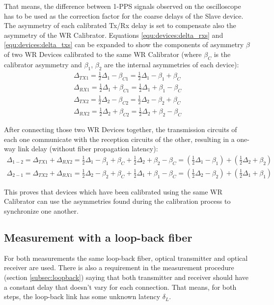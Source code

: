 That means, the difference between 1-PPS signals observed on the oscilloscope
has to be used as the correction factor for the coarse delays of the Slave
device.\\

The asymmetry of each calibrated Tx/Rx delay is set to compensate also the
asymmetry of the WR Calibrator. Equations \ref{equ:devices:delta_rxs} and
\ref{equ:devices:delta_txs} can be expanded to show the
components of asymmetry $\beta$ of two WR Devices calibrated to the same WR
Calibrator (where $\beta_C$ is the calibrator asymmetry and $\beta_1$,
$\beta_2$ are the internal asymmetries of each device):
\begin{align}
	\Delta_{TX1} = \frac{1}{2}\Delta_1 - \beta_{C1} = \frac{1}{2}\Delta_1 - \beta_1 + \beta_C \\
	\Delta_{RX1} = \frac{1}{2}\Delta_1 + \beta_{C1} = \frac{1}{2}\Delta_1 + \beta_1 - \beta_C \\
	\Delta_{TX2} = \frac{1}{2}\Delta_2 - \beta_{C2} = \frac{1}{2}\Delta_2 - \beta_2 + \beta_C \\
	\Delta_{RX2} = \frac{1}{2}\Delta_2 + \beta_{C2} = \frac{1}{2}\Delta_2 + \beta_2 - \beta_C
\end{align}

After connecting those two WR Devices together, the transmission circuits of
each one communicate with the reception circuits of the other, resulting in a
one-way link delay (without fiber propagation latency):
\begin{align}
	\Delta_{1-2} = \Delta_{TX1} + \Delta_{RX2} = \frac{1}{2}\Delta_1 - \beta_1 + \beta_C + \frac{1}{2} 
		\Delta_2 + \beta_2 - \beta_C  = (\frac{1}{2}\Delta_1 - \beta_1) +
		(\frac{1}{2}\Delta_2 + \beta_2) \\
	\Delta_{2-1} = \Delta_{TX2} + \Delta_{RX1} = \frac{1}{2}\Delta_2 - \beta_2 + \beta_C + \frac{1}{2}
		\Delta_1 + \beta_1 - \beta_C = (\frac{1}{2}\Delta_2 - \beta_2) + 
		(\frac{1}{2}\Delta_1 + \beta_1)
\end{align}

This proves that devices which have been calibrated using the same WR Calibrator
can use the asymmetries found during the calibration process to synchronize one
another.

\subsection{Measurement with a loop-back fiber}
For both measurements the same loop-back fiber, optical transmitter and optical
receiver are used. There is also a requirement in the measurement procedure
(section \ref{subsec:loopback}) saying that both transmitter and receiver should
have a constant delay that doesn't vary for each connection. That means, for
both steps, the loop-back link has some unknown latency $\delta_{L}$.\\

